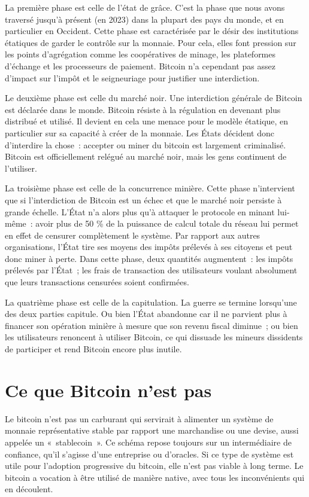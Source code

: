 \documentclass[a4paper,notitlepage]{article}
\begin{document}
La première phase est celle de l'état de grâce. C'est la phase que nous avons traversé jusqu'à présent (en 2023) dans la plupart des pays du monde, et en particulier en Occident. Cette phase est caractérisée par le désir des institutions étatiques de garder le contrôle sur la monnaie. Pour cela, elles font pression sur les points d'agrégation comme les coopératives de minage, les plateformes d'échange et les processeurs de paiement. Bitcoin n'a cependant pas assez d'impact sur l'impôt et le seigneuriage pour justifier une interdiction.

Le deuxième phase est celle du marché noir. Une interdiction générale de Bitcoin est déclarée dans le monde. Bitcoin résiste à la régulation en devenant plus distribué et utilisé. Il devient en cela une menace pour le modèle étatique, en particulier sur sa capacité à créer de la monnaie. Les États décident donc d'interdire la chose~: accepter ou miner du bitcoin est largement criminalisé. Bitcoin est officiellement relégué au marché noir, mais les gens continuent de l'utiliser.

La troisième phase est celle de la concurrence minière. Cette phase n'intervient que si l'interdiction de Bitcoin est un échec et que le marché noir persiste à grande échelle. L'État n'a alors plus qu'à attaquer le protocole en minant lui-même~: avoir plus de 50 \% de la puissance de calcul totale du réseau lui permet en effet de censurer complètement le système. Par rapport aux autres organisations, l'État tire ses moyens des impôts prélevés à ses citoyens et peut donc miner à perte. Dans cette phase, deux quantités augmentent~: les impôts prélevés par l'État~; les frais de transaction des utilisateurs voulant absolument que leurs transactions censurées soient confirmées.

La quatrième phase est celle de la capitulation. La guerre se termine lorsqu'une des deux parties capitule. Ou bien l'État abandonne car il ne parvient plus à financer son opération minière à mesure que son revenu fiscal diminue~; ou bien les utilisateurs renoncent à utiliser Bitcoin, ce qui dissuade les mineurs dissidents de participer et rend Bitcoin encore plus inutile.

\section{Ce que Bitcoin n'est pas}

Le bitcoin n'est pas un carburant qui servirait à alimenter un système de monnaie représentative stable par rapport une marchandise ou une devise, aussi appelée un «~stablecoin~». Ce schéma repose toujours sur un intermédiaire de confiance, qu'il s'agisse d'une entreprise ou d'oracles. Si ce type de système est utile pour l'adoption progressive du bitcoin, elle n'est pas viable à long terme. Le bitcoin a vocation à être utilisé de manière native, avec tous les inconvénients qui en découlent.
\end{document}

